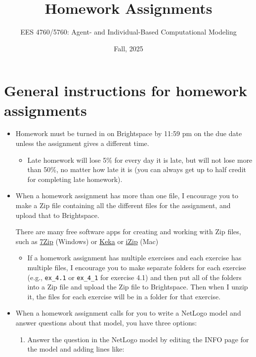 \documentclass[
]{article}
\title{Homework Assignments}
\author{EES 4760/5760: Agent- and Individual-Based Computational
Modeling}
\date{Fall, 2025}
\providecommand{\tightlist}{%
  \setlength{\itemsep}{0pt}\setlength{\parskip}{0pt}}
\begin{document}
\maketitle

\section{General instructions for homework
assignments}\label{general-instructions-for-homework-assignments}

\begin{itemize}
\item
  Homework must be turned in on Brightspace by 11:59 pm on the due date
  unless the assignment gives a different time.

  \begin{itemize}
  \tightlist
  \item
    Late homework will lose 5\% for every day it is late, but will not
    lose more than 50\%, no matter how late it is (you can always get up
    to half credit for completing late homework).
  \end{itemize}
\item
  When a homework assignment has more than one file, I encourage you to
  make a Zip file containing all the different files for the assignment,
  and upload that to Brightspace.

  There are many free software apps for creating and working with Zip
  files, such as \href{https://www.7-zip.org/}{7Zip} (Windows) or
  \href{https://www.keka.io/en/}{Keka} or
  \href{https://www.izip.com/}{iZip} (Mac)

  \begin{itemize}
  \tightlist
  \item
    If a homework assignment has multiple exercises and each exercise
    has multiple files, I encourage you to make separate folders for
    each exercise (e.g., \texttt{ex\_4.1} or \texttt{ex\_4\_1} for
    exercise 4.1) and then put all of the folders into a Zip file and
    upload the Zip file to Brightspace. Then when I unzip it, the files
    for each exercise will be in a folder for that exercise.
  \end{itemize}
\item
  When a homework assignment calls for you to write a NetLogo model and
  answer questions about that model, you have three options:

  \begin{enumerate}
  \def\labelenumi{\arabic{enumi}.}
  \item
    Answer the question in the NetLogo model by editing the INFO page
    for the model and adding lines like:


\end{enumerate}
\end{itemize}
\end{document}
